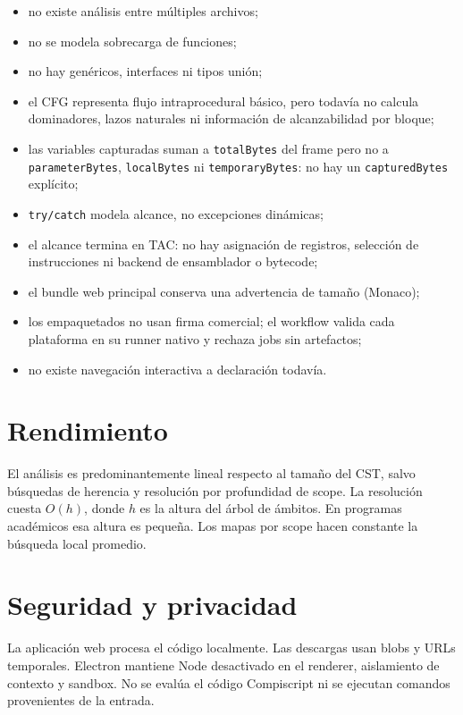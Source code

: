 \documentclass[11pt,letterpaper,oneside]{report}
\newcommand{\codigo}[1]{\texttt{#1}}
\begin{document}
\begin{itemize}
  \item no existe análisis entre múltiples archivos;
  \item no se modela sobrecarga de funciones;
  \item no hay genéricos, interfaces ni tipos unión;
  \item el CFG representa flujo intraprocedural básico, pero todavía no calcula
        dominadores, lazos naturales ni información de alcanzabilidad por bloque;
  \item las variables capturadas suman a \codigo{totalBytes} del frame pero no a
        \codigo{parameterBytes}, \codigo{localBytes} ni \codigo{temporaryBytes}: no
        hay un \codigo{capturedBytes} explícito;
  \item \codigo{try/catch} modela alcance, no excepciones dinámicas;
  \item el alcance termina en TAC: no hay asignación de registros, selección de
        instrucciones ni backend de ensamblador o bytecode;
  \item el bundle web principal conserva una advertencia de tamaño (Monaco);
  \item los empaquetados no usan firma comercial; el workflow valida cada plataforma
        en su runner nativo y rechaza jobs sin artefactos;
  \item no existe navegación interactiva a declaración todavía.
\end{itemize}

\section{Rendimiento}

El análisis es predominantemente lineal respecto al tamaño del CST, salvo búsquedas
de herencia y resolución por profundidad de scope. La resolución cuesta
\(O(h)\), donde \(h\) es la altura del árbol de ámbitos. En programas académicos esa
altura es pequeña. Los mapas por scope hacen constante la búsqueda local promedio.

\section{Seguridad y privacidad}

La aplicación web procesa el código localmente. Las descargas usan blobs y URLs
temporales. Electron mantiene Node desactivado en el renderer, aislamiento de contexto
y sandbox. No se evalúa el código Compiscript ni se ejecutan comandos provenientes de
la entrada.
\end{document}
